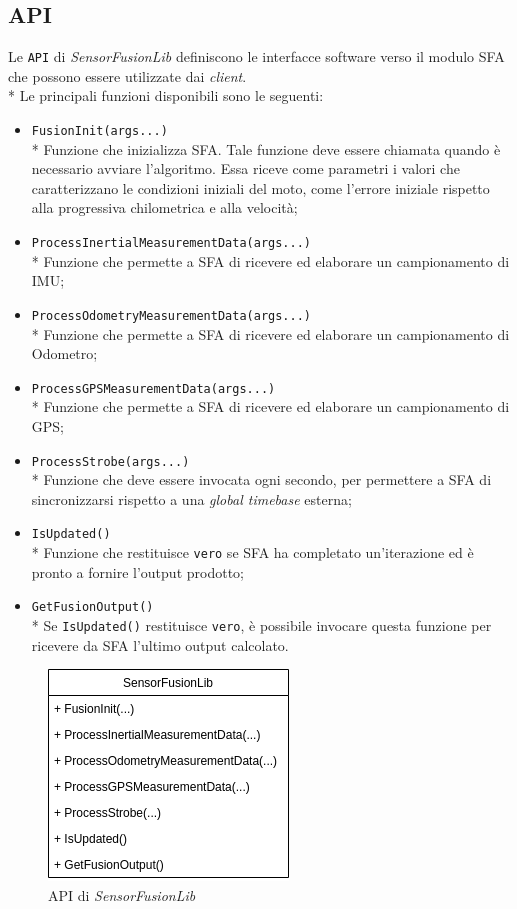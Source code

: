 \subsection{API}
Le \texttt{API} di \emph{SensorFusionLib} definiscono le interfacce software verso il modulo SFA che possono essere utilizzate dai \emph{client}.\\*
Le principali funzioni disponibili sono le seguenti:
\begin{itemize}
	\item \texttt{FusionInit(args...)}\\*
	Funzione che inizializza SFA. Tale funzione deve essere chiamata quando \`e necessario avviare l'algoritmo. Essa riceve come parametri i valori che caratterizzano le condizioni iniziali del moto, come l'errore iniziale rispetto alla progressiva chilometrica e alla velocit\`a;
	\item \texttt{ProcessInertialMeasurementData(args...)}\\*
	Funzione che permette a SFA di ricevere ed elaborare un campionamento di IMU; 
	\item \texttt{ProcessOdometryMeasurementData(args...)}\\*
	Funzione che permette a SFA di ricevere ed elaborare un campionamento di Odometro;
	\item \texttt{ProcessGPSMeasurementData(args...)}\\*
	Funzione che permette a SFA di ricevere ed elaborare un campionamento di GPS;
	\item \texttt{ProcessStrobe(args...)}\\*
	Funzione che deve essere invocata ogni secondo, per permettere a SFA di sincronizzarsi rispetto a una \emph{global timebase} esterna; \cite{clock}
	\item 
	\texttt{IsUpdated()}\\*
	Funzione che restituisce \texttt{vero} se SFA ha completato un'iterazione ed \`e pronto a fornire l'output prodotto;
	\item \texttt{GetFusionOutput()}\\*
	Se \texttt{IsUpdated()} restituisce \texttt{vero}, \`e possibile invocare questa funzione per ricevere da SFA l'ultimo output calcolato.
\end{itemize}
\begin{figure}[h]
	\centering
	\includegraphics[width=0.7\linewidth]{img/SensorFusionLib}
	\caption{API di \textit{SensorFusionLib}}
	\label{fig:sfaapi}
\end{figure}

